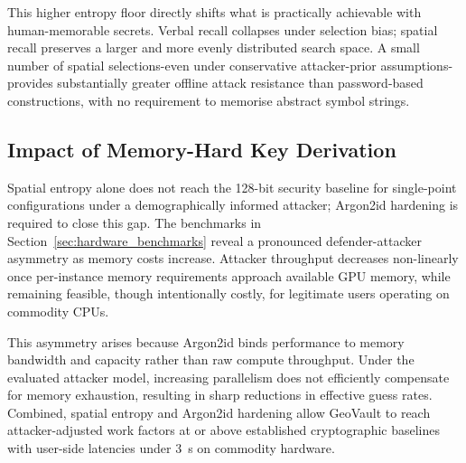 \documentclass[journal,article,submit,pdftex,moreauthors]{Definitions/mdpi}
\newcommand{\add}[1]{#1}
\newcommand{\remove}[1]{}
\newcommand{\add}[1]{\added{#1}}
\newcommand{\remove}[1]{\deleted{#1}}
\begin{document}
\remove{This higher entropy floor alters the practical boundary of what can be considered usable for human-memorable secrets. While linguistic recall rapidly collapses under selection bias, spatial recall preserves a larger and more evenly distributed search space. The results indicate that a small number of spatial selections, even under conservative attacker assumptions, provide substantially greater resistance to offline attacks than traditional password-based constructions, while remaining compatible with human memory capabilities.}\add{This higher entropy floor directly shifts what is practically achievable with human-memorable secrets. Verbal recall collapses under selection bias; spatial recall preserves a larger and more evenly distributed search space. A small number of spatial selections-even under conservative attacker-prior assumptions-provides substantially greater offline attack resistance than password-based constructions, with no requirement to memorise abstract symbol strings.}

\subsection{Impact of Memory-Hard Key Derivation}

\remove{While spatial entropy alone is insufficient to guarantee cryptographic-strength security under all attacker assumptions, the application of memory-hard key derivation functions substantially increases resistance to brute-force attacks. The Argon2id benchmarks reported in Section~\ref{sec:hardware_benchmarks} demonstrate a pronounced asymmetry between defender and attacker capabilities as memory costs increase.}\add{Spatial entropy alone does not reach the 128-bit security baseline for single-point configurations under a demographically informed attacker; Argon2id hardening is required to close this gap. The benchmarks in Section~\ref{sec:hardware_benchmarks} reveal a pronounced defender-attacker asymmetry as memory costs increase.} Attacker throughput decreases non-linearly once per-instance memory requirements approach available GPU memory, while remaining feasible, though intentionally costly, for legitimate users operating on commodity CPUs.

This asymmetry arises because Argon2id binds performance to memory bandwidth and capacity rather than raw compute throughput. Under the evaluated attacker model, increasing parallelism does not efficiently compensate for memory exhaustion, resulting in sharp reductions in effective guess rates. \remove{Consequently, GeoVault converts modest user-side latency into a disproportionate increase in attacker work, allowing spatially anchored secrets to achieve levels of brute-force resistance that approach or exceed established cryptographic security baselines when combined with sufficient effective entropy.}\add{Combined, spatial entropy and Argon2id hardening allow GeoVault to reach attacker-adjusted work factors at or above established cryptographic baselines with user-side latencies under 3~s on commodity hardware.}
\end{document}
